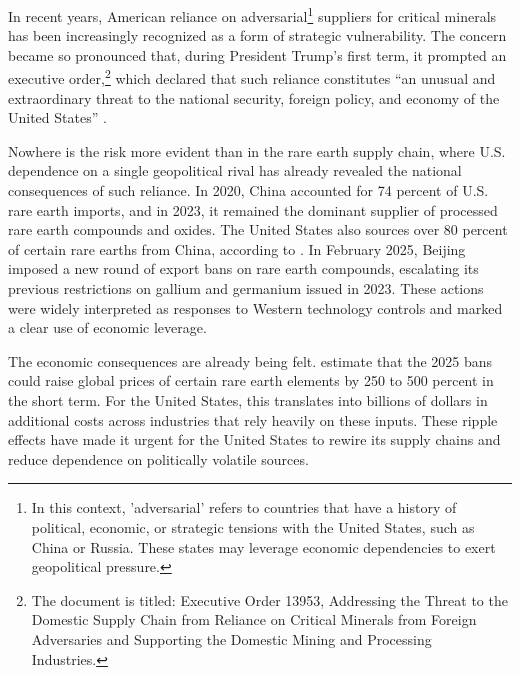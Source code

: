 \documentclass{adonis}
\begin{document}
    In recent years, American reliance on adversarial\footnote{In this context, 'adversarial' refers to countries that have a history of political, economic, or strategic tensions with the United States, such as China or Russia. These states may leverage economic dependencies to exert geopolitical pressure.} suppliers for critical minerals has been increasingly recognized as a form of strategic vulnerability. The concern became so pronounced that, during President Trump’s first term, it prompted an executive order,\footnote{The document is titled: Executive Order 13953, Addressing the Threat to the Domestic Supply Chain from Reliance on Critical Minerals from Foreign Adversaries and Supporting the Domestic Mining and Processing Industries.} which declared that such reliance constitutes “an unusual and extraordinary threat to the national security, foreign policy, and economy of the United States” \citep{executiveorder13953}.
    
    Nowhere is the risk more evident than in the rare earth supply chain, where U.S. dependence on a single geopolitical rival has already revealed the national consequences of such reliance. In 2020, China accounted for 74 percent of U.S. rare earth imports, and in 2023, it remained the dominant supplier of processed rare earth compounds and oxides. The United States also sources over 80 percent of certain rare earths from China, according to \citet{usgs_rare_earths}. In February 2025, Beijing imposed a new round of export bans on rare earth compounds, escalating its previous restrictions on gallium and germanium issued in 2023. These actions were widely interpreted as responses to Western technology controls and marked a clear use of economic leverage.
    
    The economic consequences are already being felt. \citet{anil2025antimony} estimate that the 2025 bans could raise global prices of certain rare earth elements by 250 to 500 percent in the short term. For the United States, this translates into billions of dollars in additional costs across industries that rely heavily on these inputs. These ripple effects have made it urgent for the United States to rewire its supply chains and reduce dependence on politically volatile sources.
    
\end{document}
